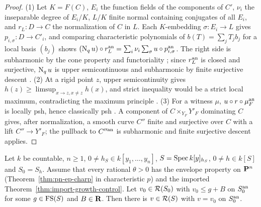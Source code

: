 \begin{proof}
(1) Let $K=F(C)$, $E_i$ the function fields of the components of $C'$, $\nu_i$ the inseparable
degree of $E_i/K$, $L/K$ finite normal containing conjugates of all $E_i$, and $r_L\colon D\to C$
the normalization of $C$ in $L$. Each $K$-embedding $\sigma\colon E_i\to L$ gives
$p_{i,\sigma}\colon D\to C'_i$, and comparing characteristic polynomials of $b(T)=\sum_jT_jb_j$ for a
local basis $(b_j)$ shows $(\operatorname{N}_qu)\circ r_L^{\mathrm{an}}=\sum_i\nu_i\sum_\sigma u\circ p_{i,\sigma}^{\mathrm{an}}$. The right side
is subharmonic by the cone property and functoriality \cite[Proposition~3.5(4),(8)]{GR25}; since
$r_L^{\mathrm{an}}$ is closed and surjective, $\operatorname{N}_qu$ is upper semicontinuous and subharmonic by finite
surjective descent \cite[Proposition~3.5(8)]{GR25}. (2) At a rigid point $z$, upper semicontinuity
gives $h(z)\ge\limsup_{x\to z,x\ne z}h(x)$, and strict inequality would be a strict local maximum,
contradicting the maximum principle \cite[Proposition~3.5(6)]{GR25}. (3) For a witness $\mu$,
$u\circ r\circ\mu_F^{\mathrm{an}}$ is locally psh, hence classically psh \cite[Proposition~4.2]{GR25}. A component of
$C\times_{Y_F}Y'_F$ dominating $C$ gives, after normalization, a smooth curve $C''$ finite and
surjective over $C$ with a lift $C''\to Y'_F$; the pullback to $C''^{\mathrm{an}}$ is subharmonic and finite
surjective descent applies.
\end{proof}

\begin{lemma}\label{lem:nonflat-extension}
\leanok
{}
Let $k$ be countable, $n\ge1$, $0\ne h_S\in k[y_1,\dots,y_n]$, $S=\operatorname{Spec} k[y]_{h_S}$, $0\ne h\in k[S]$ and $S_0=S_h$. Assume that
every rational $\theta>0$ has the envelope property on $\mathbf{P}^n$ (Theorem~\ref{thm:pn-ep-charp} in characteristic $p$) and
the imported Theorem~\ref{thm:import-growth-control}. Let $v_0\in\mathcal{R}(S_0)$ with $v_0\le g+B$ on $S_0^{\mathrm{an}}$ for some
$g\in\mathrm{FS}(S)$ and $B\in\mathbf{R}$. Then there is $v\in\mathcal{R}(S)$ with $v=v_0$ on $S_0^{\mathrm{an}}$.
\end{lemma}

